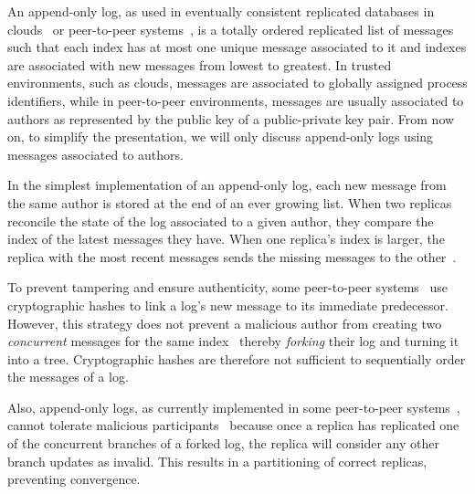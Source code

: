 \documentclass[9pt, oneside]{article}   	%
\begin{document}
An append-only log, as used in eventually consistent replicated databases in clouds~\cite{kappa-architecture,decandia2007dynamo} or peer-to-peer systems~\cite{kermarrec2020gossiping,hypercore-website}, is a totally ordered replicated list of messages such that each index has at most one unique message associated to it and indexes are associated with new messages from lowest to greatest. In trusted environments, such as clouds, messages are associated to globally assigned process identifiers, while in peer-to-peer environments, messages are usually associated to authors as represented by the public key of a public-private key pair. From now on, to simplify the presentation, we will only discuss append-only logs using messages associated to authors.

In the simplest implementation of an append-only log, each new message from the same author is stored at the end of an ever growing list. When two replicas reconcile the state of the log associated to a given author, they compare the index of the latest messages they have. When one replica's index is larger, the replica with the most recent messages sends the missing messages to the other~\cite{vanrenesse2008scuttlebutt,kermarrec2020gossiping}. 

To prevent tampering and ensure authenticity, some peer-to-peer systems~\cite{kermarrec2020gossiping,hypercore-website} use cryptographic hashes to link a log's new message to its immediate predecessor. However, this strategy does not prevent a malicious author from creating two \textit{concurrent} messages for the same index~\cite{lavoie2023gocledger,hypercore-handling-conflicts,hypercore-split-resolution-dep} thereby \textit{forking} their log and turning it into a tree. Cryptographic hashes are therefore not sufficient to sequentially order the messages of a log.

Also, append-only logs, as currently implemented in some peer-to-peer systems~\cite{kermarrec2020gossiping,lavoie2023gocledger,hypercore-handling-conflicts,hypercore-split-resolution-dep},  cannot tolerate malicious participants~\cite{Kleppmann2022byzantine,jacob2022bft-crdt} because once a replica has replicated one of the concurrent branches of a forked log, the replica will consider any other branch updates as invalid. This results in a partitioning of correct replicas, preventing convergence.
\end{document}
